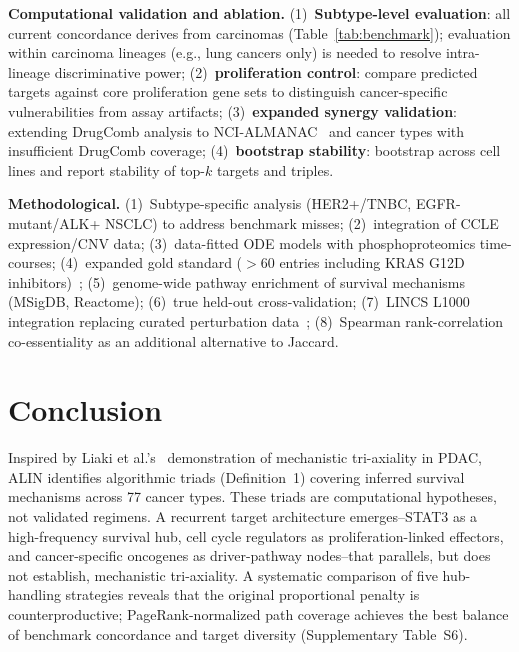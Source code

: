 \documentclass[times, twoside, watermark]{zHenriquesLab-StyleBioRxiv}
\begin{document}
\textbf{Computational validation and ablation.} (1)~\textbf{Subtype-level evaluation}: all current concordance derives from carcinomas (Table~\ref{tab:benchmark}); evaluation within carcinoma lineages (e.g., lung cancers only) is needed to resolve intra-lineage discriminative power; (2)~\textbf{proliferation control}: compare predicted targets against core proliferation gene sets to distinguish cancer-specific vulnerabilities from assay artifacts; (3)~\textbf{expanded synergy validation}: extending DrugComb analysis to NCI-ALMANAC~\cite{Holbeck2017} and cancer types with insufficient DrugComb coverage; (4)~\textbf{bootstrap stability}: bootstrap across cell lines and report stability of top-$k$ targets and triples.

\textbf{Methodological.} (1)~Subtype-specific analysis (HER2+/TNBC, EGFR-mutant/ALK+ NSCLC) to address benchmark misses; (2)~integration of CCLE expression/CNV data; (3)~data-fitted ODE models with phosphoproteomics time-courses; (4)~expanded gold standard ($>$60 entries including KRAS G12D inhibitors)~\cite{Menden2019,Holbeck2017}; (5)~genome-wide pathway enrichment of survival mechanisms (MSigDB, Reactome); (6)~true held-out cross-validation; (7)~LINCS L1000 integration replacing curated perturbation data~\cite{Subramanian2017}; (8)~Spearman rank-correlation co-essentiality as an additional alternative to Jaccard.

\section*{Conclusion}

Inspired by Liaki et al.'s~\cite{Liaki2025} demonstration of mechanistic tri-axiality in PDAC, ALIN identifies algorithmic triads (Definition~1) covering inferred survival mechanisms across 77 cancer types. These triads are computational hypotheses, not validated regimens. A recurrent target architecture emerges--STAT3 as a high-frequency survival hub, cell cycle regulators as proliferation-linked effectors, and cancer-specific oncogenes as driver-pathway nodes--that parallels, but does not establish, mechanistic tri-axiality. A systematic comparison of five hub-handling strategies reveals that the original proportional penalty is counterproductive; PageRank-normalized path coverage achieves the best balance of benchmark concordance and target diversity (Supplementary Table~S6).
\end{document}

